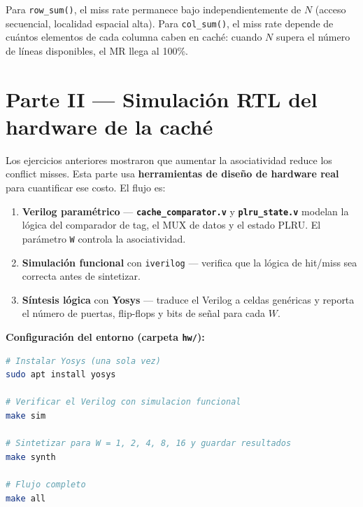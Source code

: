 \documentclass[12pt, a4paper]{article}
\newcommand{\archivo}[1]{\texttt{\textbf{#1}}}
\begin{document}
\begin{conclusion}
    Para \texttt{row\_sum()}, el miss rate permanece bajo independientemente de $N$
    (acceso secuencial, localidad espacial alta). Para \texttt{col\_sum()},
    el miss rate depende de cuántos elementos de cada columna caben en caché:
    cuando $N$ supera el número de líneas disponibles, el MR llega al 100\%.
\end{conclusion}

\newpage

\section{Parte II — Simulación RTL del hardware de la caché}

Los ejercicios anteriores mostraron que aumentar la asociatividad reduce los
conflict misses. Esta parte usa \textbf{herramientas de diseño de hardware
real} para cuantificar ese costo. El flujo es:

\begin{enumerate}
    \item \textbf{Verilog paramétrico} — \archivo{cache\_comparator.v} y
          \archivo{plru\_state.v} modelan la lógica del comparador de tag,
          el MUX de datos y el estado PLRU. El parámetro \texttt{W}
          controla la asociatividad.
    \item \textbf{Simulación funcional} con \texttt{iverilog} — verifica que
          la lógica de hit/miss sea correcta antes de sintetizar.
    \item \textbf{Síntesis lógica} con \textbf{Yosys} — traduce el Verilog a
          celdas genéricas y reporta el número de puertas, flip-flops y
          bits de señal para cada $W$.
\end{enumerate}

\begin{ripes}
    \textbf{Configuración del entorno (carpeta \texttt{hw/}):}
\begin{lstlisting}[language=bash, numbers=none]
# Instalar Yosys (una sola vez)
sudo apt install yosys

# Verificar el Verilog con simulacion funcional
make sim

# Sintetizar para W = 1, 2, 4, 8, 16 y guardar resultados
make synth

# Flujo completo
make all
\end{lstlisting}

\end{ripes}
\end{document}
